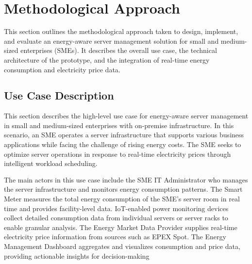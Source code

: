 

\section{Methodological Approach}
\label{methodology:methodological-approach}
This section outlines the methodological approach taken to design, implement, and evaluate an energy-aware server management solution for small and medium-sized enterprises (SMEs).
It describes the overall use case, the technical architecture of the prototype, and the integration of real-time energy consumption and electricity price data.

\subsection{Use Case Description}
\label{methodology:use-case-description}
This section describes the high-level use case for energy-aware server management in small and medium-sized enterprises with on-premise infrastructure. In this scenario, an SME operates a server infrastructure that supports various business applications while facing the challenge of rising energy costs. The SME seeks to optimize server operations in response to real-time electricity prices through intelligent workload scheduling.

The main actors in this use case include the SME IT Administrator who manages the server infrastructure and monitors energy consumption patterns. The Smart Meter measures the total energy consumption of the SME's server room in real time and provides facility-level data. IoT-enabled power monitoring devices collect detailed consumption data from individual servers or server racks to enable granular analysis. The Energy Market Data Provider supplies real-time electricity price information from sources such as EPEX Spot. The Energy Management Dashboard aggregates and visualizes consumption and price data, providing actionable insights for decision-making

